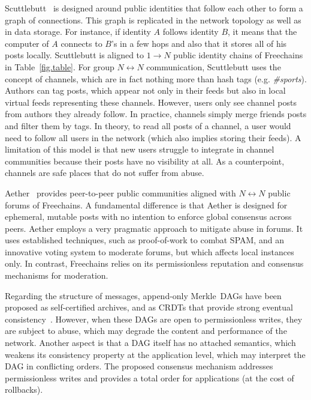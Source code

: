 \documentclass[12pt]{article}
\newcommand{\FC}       {Freechains\xspace}
\newcommand{\Xon} {$1{\rightarrow}N$\xspace}
\newcommand{\Xnn} {$N{\leftrightarrow}N$\xspace}
\begin{document}
Scuttlebutt~\cite{p2p.scuttlebutt} is designed around public identities that
follow each other to form a graph of connections.
This graph is replicated in the network topology as well as in data storage.
For instance, if identity $A$ follows identity $B$, it means that the computer
of $A$ connects to $B$'s in a few hops and also that it stores all of his posts
locally.
Scuttlebutt is aligned to \Xon public identity chains of \FC in
Table~\ref{fig.table}.
%
For group \Xnn communication, Scuttlebutt uses the concept of channels, which
are in fact nothing more than hash tags (e.g. \emph{\#sports}).
Authors can tag posts, which appear not only in their feeds but also in local
virtual feeds representing these channels.
However, users only see channel posts from authors they already follow.
In practice, channels simply merge friends posts and filter them by tags.
In theory, to read all posts of a channel, a user would need to follow all
users in the network (which also implies storing their feeds).
A limitation of this model is that new users struggle to integrate in channel
communities because their posts have no visibility at all.
As a counterpoint, channels are safe places that do not suffer from abuse.
%

Aether~\cite{p2p.ecosystem} provides peer-to-peer public communities aligned
with \Xnn public forums of \FC.
A fundamental difference is that Aether is designed for ephemeral, mutable
posts with no intention to enforce global consensus across peers.
Aether employs a very pragmatic approach to mitigate abuse in forums.
It uses established techniques, such as proof-of-work to combat SPAM, and an
innovative voting system to moderate forums, but which affects local instances
only.
In contrast, \FC relies on its permissionless reputation and consensus
mechanisms for moderation.

Regarding the structure of messages, append-only Merkle~DAGs have been proposed
as self-certified archives, and as CRDTs that provide strong eventual
consistency~\cite{fed.matrix,p2p.byz}.
However, when these DAGs are open to permissionless writes, they are subject to
abuse, which may degrade the content and performance of the network.
Another aspect is that a DAG itself has no attached semantics, which weakens
its consistency property at the application level, which may interpret the DAG
in conflicting orders.
The proposed consensus mechanism addresses permissionless writes and provides
a total order for applications (at the cost of rollbacks).
\end{document}
